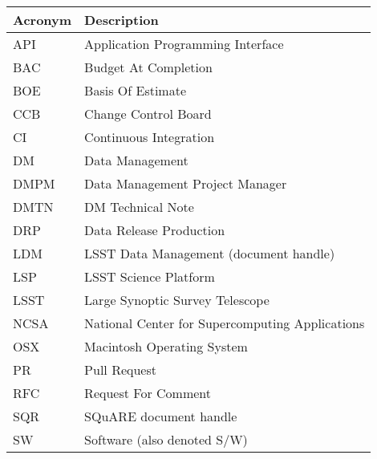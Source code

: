\addtocounter{table}{-1}
\begin{longtable}{|l|p{}|}\hline
\textbf{Acronym} & \textbf{Description}  \\\hline

API & Application Programming Interface \\\hline
BAC & Budget At Completion \\\hline
BOE & Basis Of Estimate \\\hline
CCB & Change Control Board \\\hline
CI & Continuous Integration \\\hline
DM & Data Management \\\hline
DMPM & Data Management Project Manager \\\hline
DMTN & \gls{DM} Technical Note \\\hline
DRP & Data Release Production \\\hline
LDM & \gls{LSST} Data Management (document handle) \\\hline
LSP & \gls{LSST} Science Platform \\\hline
LSST & Large Synoptic Survey Telescope \\\hline
NCSA & National Center for Supercomputing Applications \\\hline
OSX & Macintosh Operating System \\\hline
PR & Pull Request \\\hline
RFC & Request For Comment \\\hline
SQR & SQuARE document handle \\\hline
SW & Software (also denoted S/W) \\\hline
\end{longtable}
